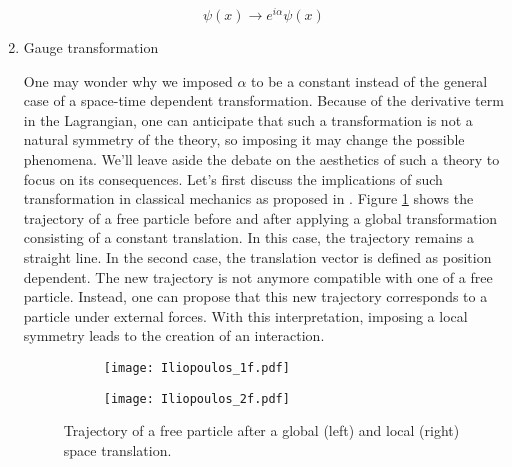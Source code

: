 \begin{enumerate}
\begin{equation}
\label{eq:org3048dc4}
\psi(x)\rightarrow e^{i\alpha}\psi(x)
\end{equation}

\item Gauge transformation
\label{sec:orgf786a4f}

One may wonder why we imposed \(\alpha\) to be a constant instead of the general case of a space-time dependent transformation.
Because of the derivative term in the Lagrangian, one can anticipate that such a transformation is not a natural symmetry of the theory, so imposing it may change the possible phenomena.
We'll leave aside the debate on the aesthetics of such a theory to focus on its consequences.
Let's first discuss the implications of such transformation in classical mechanics as proposed in \cite{Iliopoulos:1551844}.
Figure \ref{org992d083} shows the trajectory of a free particle before and after applying a global transformation consisting of a constant translation.
In this case, the trajectory remains a straight line.
In the second case, the translation vector is defined as position dependent.
The new trajectory is not anymore compatible with one of a free particle.
Instead, one can propose that this new trajectory corresponds to a particle under external forces.
With this interpretation, imposing a local symmetry leads to the creation of an interaction.

\begin{figure}
\begin{subfigure}[t]{0.49\linewidth}
\begin{center}
\texttt{[image: Iliopoulos\_1f.pdf]}
\end{center}
\end{subfigure}
\begin{subfigure}[t]{0.49\linewidth}
\begin{center}
\texttt{[image: Iliopoulos\_2f.pdf]}
\end{center}
\end{subfigure}
\caption{\label{org992d083}
Trajectory of a free particle after a global (left) and local (right) space translation. \cite{Iliopoulos:1551844}}
\end{figure}


\end{enumerate}

